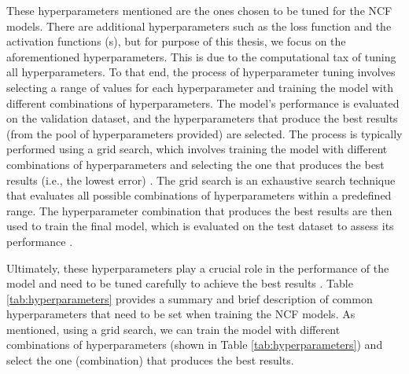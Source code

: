 These hyperparameters mentioned are the ones chosen to be tuned for the NCF models. There are additional hyperparameters such as the loss function and the activation functions (s), but for purpose of this thesis, we focus on the aforementioned hyperparameters. This is due to the computational tax of tuning all hyperparameters. To that end, the process of hyperparameter tuning involves selecting a range of values for each hyperparameter and training the model with different combinations of hyperparameters. The model's performance is evaluated on the validation dataset, and the hyperparameters that produce the best results (from the pool of hyperparameters provided) are selected. The process is typically performed using a grid search, which involves training the model with different combinations of hyperparameters and selecting the one that produces the best results (i.e., the lowest error) \cite{bergstra2011algorithms}. The grid search is an exhaustive search technique that evaluates all possible combinations of hyperparameters within a predefined range. The hyperparameter combination that produces the best results are then used to train the final model, which is evaluated on the test dataset to assess its performance \cite{bergstra2011algorithms}.

Ultimately, these hyperparameters play a crucial role in the performance of the model and need to be tuned carefully to achieve the best results \cite{bergstra2011algorithms}. Table \ref{tab:hyperparameters} provides a summary and brief description of common hyperparameters that need to be set when training the NCF models. As mentioned, using a grid search, we can train the model with different combinations of hyperparameters (shown in Table \ref{tab:hyperparameters}) and select the one (combination) that produces the best results. 

